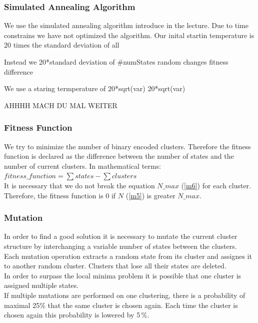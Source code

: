 \subsubsection{Simulated Annealing Algorithm}
\label{subsubsec:SAAlgorithm}

We use the simulated annealing algorithm introduce in the lecture. Due to time constrains we have not optimized the algorithm. Our inital startin temperature is 20 times the standard deviation of all 

Instead we 
20*standard deviation of #numStates random changes fitness difference

We use a staring termperature of 20*sqrt(var)
20*sqrt(var)

AHHHH MACH DU MAL WEITER



\subsubsection{Fitness Function}
\label{subsubsec:FitnessFunction}

We try to minimize the number of binary encoded clusters. Therefore the fitness function is declared as the difference between the number of states and the number of current clusters. In mathematical terms: 
$ fitness\_function = \sum{states} - \sum{clusters} $\\
It is necessary that we do not break the equation  $N\_max$ (\ref{m6}) for each cluster. Therefore, the fitness function is 0 if $ N $ (\ref{m5}) is greater $N\_max$.

\subsubsection{Mutation}
\label{subsubsec:Mutation}

In order to find a good solution it is necessary to mutate the current cluster structure by interchanging a variable number of states between the clusters. \\
Each mutation operation extracts a random state from its cluster and assignes it to another random cluster. Clusters that lose all their states are deleted. \\
In order to surpass the local minima problem it is possible that one cluster is assigned multiple states.\\
If multiple mutations are performed on one clustering, there is a probability of maximal 25\% that the same cluster is chosen again. Each time the cluster is chosen again this probability is lowered by 5\,\%.


